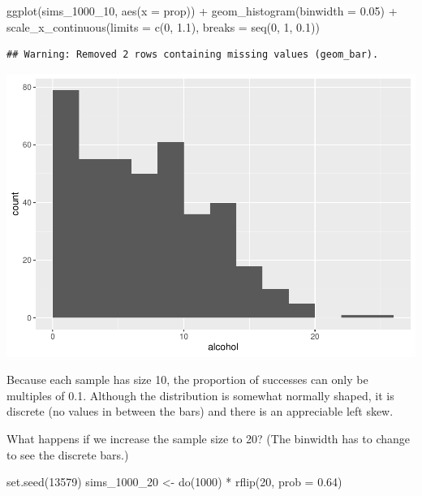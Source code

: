 \documentclass[
]{book}
\newenvironment{Shaded}{\begin{snugshade}}{\end{snugshade}}
\newcommand{\AttributeTok}[1]{\textcolor[rgb]{0.77,0.63,0.00}{#1}}
\newcommand{\DecValTok}[1]{\textcolor[rgb]{0.00,0.00,0.81}{#1}}
\newcommand{\FloatTok}[1]{\textcolor[rgb]{0.00,0.00,0.81}{#1}}
\newcommand{\FunctionTok}[1]{\textcolor[rgb]{0.00,0.00,0.00}{#1}}
\newcommand{\NormalTok}[1]{#1}
\newcommand{\OtherTok}[1]{\textcolor[rgb]{0.56,0.35,0.01}{#1}}
\newcommand{\SpecialCharTok}[1]{\textcolor[rgb]{0.00,0.00,0.00}{#1}}
\begin{document}
\begin{Shaded}
\begin{Highlighting}[]
\FunctionTok{ggplot}\NormalTok{(sims\_1000\_10, }\FunctionTok{aes}\NormalTok{(}\AttributeTok{x =}\NormalTok{ prop)) }\SpecialCharTok{+}
    \FunctionTok{geom\_histogram}\NormalTok{(}\AttributeTok{binwidth =} \FloatTok{0.05}\NormalTok{) }\SpecialCharTok{+}
    \FunctionTok{scale\_x\_continuous}\NormalTok{(}\AttributeTok{limits =} \FunctionTok{c}\NormalTok{(}\DecValTok{0}\NormalTok{, }\FloatTok{1.1}\NormalTok{),}
                       \AttributeTok{breaks =} \FunctionTok{seq}\NormalTok{(}\DecValTok{0}\NormalTok{, }\DecValTok{1}\NormalTok{, }\FloatTok{0.1}\NormalTok{))}
\end{Highlighting}
\end{Shaded}

\begin{verbatim}
## Warning: Removed 2 rows containing missing values (geom_bar).
\end{verbatim}

\includegraphics{intro_stats_files/figure-latex/unnamed-chunk-369-1.pdf}

Because each sample has size 10, the proportion of successes can only be multiples of 0.1. Although the distribution is somewhat normally shaped, it is discrete (no values in between the bars) and there is an appreciable left skew.

What happens if we increase the sample size to 20? (The binwidth has to change to see the discrete bars.)

\begin{Shaded}
\begin{Highlighting}[]
\FunctionTok{set.seed}\NormalTok{(}\DecValTok{13579}\NormalTok{)}
\NormalTok{sims\_1000\_20 }\OtherTok{\textless{}{-}} \FunctionTok{do}\NormalTok{(}\DecValTok{1000}\NormalTok{) }\SpecialCharTok{*} \FunctionTok{rflip}\NormalTok{(}\DecValTok{20}\NormalTok{, }\AttributeTok{prob =} \FloatTok{0.64}\NormalTok{)}
\end{Highlighting}
\end{Shaded}
\end{document}
